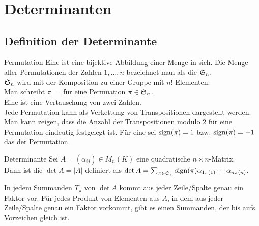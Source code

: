 \chapter{%
    Determinanten%
}

\section{%
    Definition der Determinante%
}

\begin{Def}{Permutation}
    Eine  ist eine bijektive Abbildung einer Menge in
    sich.
    Die Menge aller Permutationen der Zahlen $1, \ldots, n$ bezeichnet man
    als die  $\mathfrak{S}_n$. \\
    $\mathfrak{S}_n$ wird mit der Komposition zu einer Gruppe mit $n!$ Elementen. \\
    Man schreibt $\pi =$  für eine Permuation
    $\pi \in \mathfrak{S}_n$. \\
    Eine  ist eine Vertauschung von zwei Zahlen. \\
    Jede Permutation kann als Verkettung von Transpositionen dargestellt
    werden. \\
    Man kann zeigen, dass die Anzahl der Transpositionen modulo $2$ für eine
    Permutation eindeutig festgelegt ist.
    Für eine  sei $\operatorname{sign}(\pi) = 1$
    bzw. $\operatorname{sign}(\pi) = -1$ das  der Permutation.
\end{Def}

\begin{Def}{Determinante}
    Sei $A = (\alpha_{ij}) \in M_n(K)$ eine quadratische
    $n \times n$-Matrix. \\
    Dann ist die  $\det A = |A|$ definiert als
    $\det A = \sum_{\pi \in \mathfrak{S}_n} \operatorname{sign}(\pi) \alpha_{1 \pi(1)} \cdots
    \alpha_{n \pi(n)}$.
\end{Def}

\begin{Kor}
    In jedem Summanden $T_\pi$ von $\det A$ kommt aus jeder Zeile/Spalte
    genau ein Faktor vor.
    Für jedes Produkt von Elementen aus $A$, in dem aus jeder Zeile/Spalte
    genau ein Faktor vorkommt, gibt es einen Summanden, der bis aufs
    Vorzeichen gleich ist.
\end{Kor}


